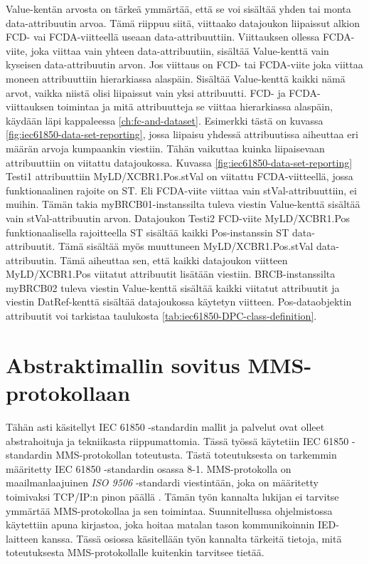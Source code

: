 Value-kentän arvosta on tärkeä ymmärtää, että se voi sisältää yhden tai monta data-att\-ri\-buu\-tin arvoa. Tämä riippuu siitä, viittaako datajoukon liipaissut alkion FCD- vai FCDA-viitteellä useaan data-attribuuttiin. Viittauksen ollessa FCDA-viite, joka viittaa vain yhteen data-attribuutiin, sisältää Value-kenttä vain kyseisen data-attribuutin arvon. Jos viittaus on FCD- tai FCDA-viite joka viittaa moneen attribuuttiin hierarkiassa alaspäin. Sisältää Value-kenttä kaikki nämä arvot, vaikka niistä olisi liipaissut vain yksi attribuutti. FCD- ja FCDA-viittauksen toimintaa ja mitä attribuutteja se viittaa hierarkiassa alaspäin, käydään läpi kappaleessa \ref{ch:fc-and-dataset}. Esimerkki tästä on kuvassa \ref{fig:iec61850-data-set-reporting}, jossa liipaisu yhdessä attribuutissa aiheuttaa eri määrän arvoja kumpaankin viestiin. Tähän vaikuttaa kuinka liipaisevaan attribuuttiin on viitattu datajoukossa. Kuvassa \ref{fig:iec61850-data-set-reporting} Testi1 attribuuttiin My\-LD\-/\-XCBR1\-.\-Pos\-.\-st\-Val on viitattu FCDA-viitteellä, jossa funktionaalinen rajoite on ST. Eli FCDA-viite viittaa vain stVal-attribuuttiin, ei muihin. Tämän takia myBRCB01-instanssilta tuleva viestin Value-kenttä sisältää vain stVal-attribuutin arvon. Datajoukon Testi2 FCD-viite My\-LD\-/\-XCBR1\-.\-Pos funktionaalisella rajoitteella ST sisältää kaikki Pos-instanssin ST data-attribuutit. Tämä sisältää myös muuttuneen MyLD/XCBR1.Pos.stVal data-attribuutin. Tämä aiheuttaa sen, että kaikki datajoukon viitteen My\-LD\-/\-XCBR1\-.\-Pos viitatut attribuutit lisätään viestiin. BRCB-instanssilta myBRCB02 tuleva viestin Value-kenttä sisältää kaikki viitatut attribuutit ja viestin DatRef-kenttä sisältää datajoukossa käytetyn viitteen. Pos-dataobjektin attribuutit voi tarkistaa taulukosta \ref{tab:iec61850-DPC-class-definition}. \mbox{\cite[s.~40--44]{IEC61850-7-1}} \mbox{\cite[s.~108]{IEC61850-7-2}}


\section{Abstraktimallin sovitus MMS-protokollaan}
\label{ch:iec61850-mms-mallinnus}
Tähän asti käsitellyt IEC 61850 -standardin mallit ja palvelut ovat olleet abstrahoituja ja tekniikasta riippumattomia. Tässä työssä käytetiin IEC 61850 -standardin MMS-protokollan toteutusta. Tästä toteutuksesta on tarkemmin määritetty IEC 61850 -stan\-dar\-din osassa 8-1. MMS-protokolla on maailmanlaajuinen \emph{ISO 9506} -standardi viestintään, joka on määritetty toimivaksi TCP/IP:n pinon päällä \mbox{\cite{MMS-protocol-stack-and-API}}. Tämän työn kannalta lukijan ei tarvitse ymmärtää MMS-protokollaa ja sen toimintaa. Suunnitellussa ohjelmistossa käytettiin apuna kirjastoa, joka hoitaa matalan tason kommunikoinnin IED-laitteen kanssa. Tässä osiossa käsitellään työn kannalta tärkeitä tietoja, mitä toteutuksesta MMS-protokollalle kuitenkin tarvitsee tietää. \mbox{\cite{Introduction-to-the-MMS}}

